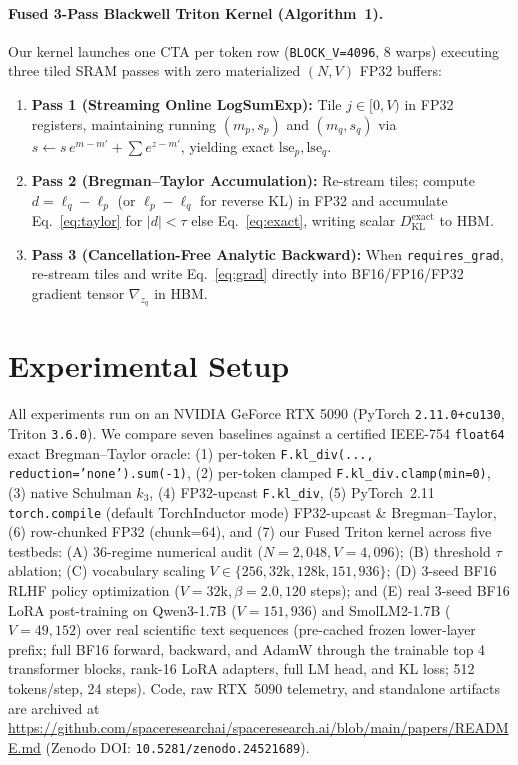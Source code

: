 \documentclass[10pt]{article}
\newcommand{\KL}{D_{\mathrm{KL}}}
\begin{document}
\paragraph{Fused 3-Pass Blackwell Triton Kernel (Algorithm~1).} Our kernel launches one CTA per token row (\texttt{BLOCK\_V=4096}, 8 warps) executing three tiled SRAM passes with zero materialized $(N,V)$ FP32 buffers:
\begin{enumerate}[leftmargin=1.6em,itemsep=1pt,topsep=2pt]
  \item \textbf{Pass 1 (Streaming Online LogSumExp):} Tile $j \in [0, V)$ in FP32 registers, maintaining running $(m_p, s_p)$ and $(m_q, s_q)$ via $s \leftarrow s\,e^{m - m'} + \sum e^{z - m'}$, yielding exact $\mathrm{lse}_p, \mathrm{lse}_q$.
  \item \textbf{Pass 2 (Bregman--Taylor Accumulation):} Re-stream tiles; compute $d = \ell_q - \ell_p$ (or $\ell_p - \ell_q$ for reverse KL) in FP32 and accumulate Eq.~\eqref{eq:taylor} for $|d| < \tau$ else Eq.~\eqref{eq:exact}, writing scalar $\KL^{\mathrm{exact}}$ to HBM.
  \item \textbf{Pass 3 (Cancellation-Free Analytic Backward):} When \texttt{requires\_grad}, re-stream tiles and write Eq.~\eqref{eq:grad} directly into BF16/FP16/FP32 gradient tensor $\nabla_{z_q}$ in HBM.
\end{enumerate}

\section{Experimental Setup}
All experiments run on an NVIDIA GeForce RTX 5090 (PyTorch \texttt{2.11.0+cu130}, Triton \texttt{3.6.0}). We compare seven baselines against a certified IEEE-754 \texttt{float64} exact Bregman--Taylor oracle: (1) per-token \texttt{F.kl\_div(..., reduction='none').sum(-1)}, (2) per-token clamped \texttt{F.kl\_div.clamp(min=0)}, (3) native Schulman $k_3$, (4) FP32-upcast \texttt{F.kl\_div}, (5) PyTorch~2.11 \texttt{torch.compile} (default TorchInductor mode) FP32-upcast \& Bregman--Taylor, (6) row-chunked FP32 (chunk=64), and (7) our Fused Triton kernel across five testbeds: (A) 36-regime numerical audit ($N=2{,}048, V=4{,}096$); (B) threshold $\tau$ ablation; (C) vocabulary scaling $V \in \{256, 32\text{k}, 128\text{k}, 151{,}936\}$; (D) 3-seed BF16 RLHF policy optimization ($V=32\text{k}, \beta=2.0, 120$ steps); and (E) real 3-seed BF16 LoRA post-training on Qwen3-1.7B ($V=151{,}936$) and SmolLM2-1.7B ($V=49{,}152$) over real scientific text sequences (pre-cached frozen lower-layer prefix; full BF16 forward, backward, and AdamW through the trainable top 4 transformer blocks, rank-16 LoRA adapters, full LM head, and KL loss; 512 tokens/step, 24 steps). Code, raw RTX~5090 telemetry, and standalone artifacts are archived at \url{https://github.com/spaceresearchai/spaceresearch.ai/blob/main/papers/README.md} (Zenodo DOI: \texttt{10.5281/zenodo.24521689}).
\end{document}
